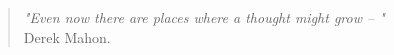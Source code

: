 \vspace{20mm}
\begin{quote}

\textit{"Even now there are places where a thought might grow -- "}\\
Derek Mahon.

\end{quote}
